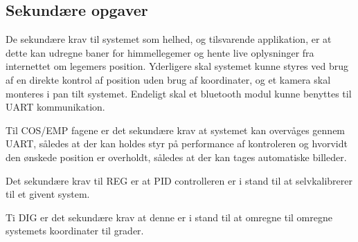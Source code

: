 \subsection{Sekundære opgaver}

De sekundære krav til systemet som helhed, og tilsvarende applikation, er at dette kan udregne baner for himmellegemer og hente live oplysninger fra internettet om legemers position. Yderligere skal systemet kunne styres ved brug af en direkte kontrol af position uden brug af koordinater, og et kamera skal monteres i pan tilt systemet. Endeligt skal et bluetooth modul kunne benyttes til UART kommunikation.

Til COS/EMP fagene er det sekundære krav at systemet kan overvåges gennem UART, således at der kan holdes styr på performance af kontroleren og hvorvidt den ønskede position er overholdt, således at der kan tages automatiske billeder.

Det sekundære krav til REG er at PID controlleren er i stand til at selvkalibrerer til et givent system.

Ti DIG er det sekundære krav at denne er i stand til at omregne til omregne systemets koordinater til grader.

%	
